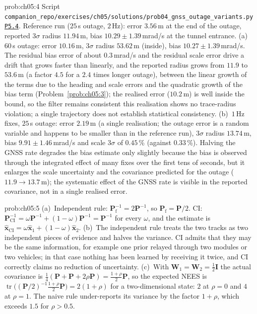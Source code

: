 \documentclass[graybox,envcountchap]{style/SNmono}
\DeclareMathOperator{\tr}{tr}
\newcommand{\repopath}[1]{\texttt{#1}}
\providecommand{\DIFadd}[1]{{\protect\color{blue} #1}} %
\providecommand{\DIFdel}[1]{{\protect\color{red} #1}} %
\providecommand{\DIFaddbegin}{} %
\providecommand{\DIFaddend}{} %
\providecommand{\DIFdelbegin}{} %
\providecommand{\DIFdelend}{} %
\DeclareRobustCommand{\RtwoDel}[1]{{\color{red}%
  \renewcommand{\DIFadd}[1]{##1}\renewcommand{\DIFdel}[1]{##1}%
  #1}}
\DeclareRobustCommand{\RtwoAdd}[1]{{\color{blue}#1}}
\DeclareRobustCommand{\codeentry}[1]{\hyperref[code:#1]{\texttt{#1}}}
\begin{document}
\begin{sol}{prob:ch05:4}
Script \RtwoDel{\repopath{companion\_\allowbreak repo/\allowbreak exercises/\allowbreak ch05/\allowbreak solutions/\allowbreak prob04\_\allowbreak gnss\_\allowbreak outage\_\allowbreak variants.py}}\RtwoAdd{\codeentry{P5.4}}. Reference run ($25$\,s outage, $2$\,Hz): error $3.56$\,m at the end of the outage, reported $3\sigma$ radius $11.94$\,m, bias $10.29\pm1.39$\,mrad/s at the tunnel entrance. (a)~$60$\,s outage: error $10.16$\,m, $3\sigma$ radius $53.62$\,m (inside), bias $10.27\pm1.39$\,mrad/s. The residual bias error of about $0.3$\,mrad/s and the residual scale error drive a drift that grows faster than linearly, and the reported radius grows from $11.9$ to $53.6$\,m (a factor $4.5$ for a $2.4$ times longer outage), between the linear growth of the terms due to the heading and scale errors and the quadratic growth of the bias term (Problem~\ref{prob:ch05:3}); the realised error ($10.2$\,m) is well inside the bound, so \DIFdelbegin \DIFdel{the filter remains consistent}\DIFdelend \DIFaddbegin \DIFadd{this realisation shows no trace-radius violation; a single trajectory does not establish statistical consistency}\DIFaddend . (b)~$1$\,Hz fixes, $25$\,s outage: error $2.19$\,m (a single realisation; the outage error is a random variable and happens to be smaller than in the reference run), $3\sigma$ radius $13.74$\,m, bias $9.91\pm1.46$\,mrad/s and scale $3\sigma$ of $0.45$\,\% (against $0.33$\,\%). Halving the GNSS rate degrades the bias estimate only slightly because the bias is observed through the integrated effect of many fixes over the first tens of seconds, but it enlarges the scale uncertainty and the covariance predicted for the outage ($11.9\to13.7$\,m); the systematic effect of the GNSS rate is visible in the reported covariance, not in a single realised error.
\end{sol}

\begin{sol}{prob:ch05:5}
(a)~Independent rule: $\mathbf{P}_{\mathrm{f}}^{-1}=2\mathbf{P}^{-1}$, so $\mathbf{P}_{\mathrm{f}}=\mathbf{P}/2$. CI: $\mathbf{P}_{\mathrm{CI}}^{-1}=\omega\mathbf{P}^{-1}+(1-\omega)\mathbf{P}^{-1}=\mathbf{P}^{-1}$ for every $\omega$, and the estimate is $\widehat{\mathbf{x}}_{\mathrm{CI}}=\omega\widehat{\mathbf{x}}_{1}+(1-\omega)\widehat{\mathbf{x}}_{2}$. (b)~The independent rule treats the two tracks as two independent pieces of evidence and halves the variance. CI admits that they may be the same information, for example one prior relayed through two modules or two vehicles; in that case nothing has been learned by receiving it twice, and CI correctly claims no reduction of uncertainty. (c)~With $\mathbf{W}_{1}=\mathbf{W}_{2}=\tfrac{1}{2}\mathbf{I}$ the actual covariance is $\tfrac{1}{4}(\mathbf{P}+\mathbf{P}+2\rho\mathbf{P})=\tfrac{1+\rho}{2}\mathbf{P}$, so the expected NEES is $\tr\big((\mathbf{P}/2)^{-1}\tfrac{1+\rho}{2}\mathbf{P}\big)=2(1+\rho)$ for a two-dimensional state: $2$ at $\rho=0$ and $4$ at $\rho=1$. The naive rule under-reports its variance by the factor $1+\rho$, which exceeds $1.5$ for $\rho>0.5$.
\end{sol}
\end{document}
